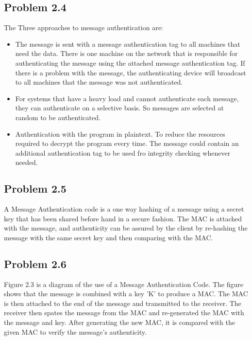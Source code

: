 \documentclass[14pt]{article}
\begin{document}
\subsection{Problem  2.4}
The Three approaches to message authentication are:
\begin{itemize}
\item The message is sent with a message authentication tag to all machines that need the data. There is one machine on the network that is responsible for authenticating the message using the attached message authentication tag. If there is a problem with the message, the authenticating device will broadcast to all machines that the message was not authenticated.
\item For systems that have a heavy load and cannot authenticate each message, they can authenticate on a selective basis. So messages are selected at random to be authenticated. 
\item Authentication with the program in plaintext. To reduce the resources required to decrypt the program every time. The message could contain an additional authentication tag to be used fro integrity checking whenever needed.
\end{itemize}

\subsection{Problem  2.5}
A Message Authentication code is a one way hashing of a message using a secret key that has been shared before hand in a secure fashion. The MAC is attached with the message, and authenticity can be assured by the client by re-hashing the message with the same secret key and then comparing with the MAC. 

\subsection{Problem  2.6}
Figure 2.3 is a diagram of the use of a Message Authentication Code. The figure shows that the message is combined with a key 'K' to produce a MAC. The MAC is then attached to the end of the message and transmitted to the receiver. The receiver then spates the message from the MAC and re-generated the MAC with the message and key. After generating the new MAC, it is compared with the given MAC to verify the message's authenticity.
\end{document}
